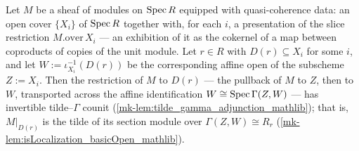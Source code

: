 \begin{lemma}
  \label{mk-lem:isIso_fromTildeΓ_basicOpen_of_quasicoherent}
  \leanok

  Let \(M\) be a sheaf of modules on \(\operatorname{Spec} R\) equipped with quasi-coherence data: an
  open cover \(\{X_i\}\) of \(\operatorname{Spec} R\) together with, for each \(i\), a presentation of
  the slice restriction \(M.\mathrm{over}\,X_i\) — an exhibition of it as the cokernel of
  a map between coproducts of copies of the unit module. Let \(r \in R\) with
  \(D(r) \subseteq X_i\) for some \(i\), and let \(W := \iota_{X_i}^{-1}(D(r))\) be the
  corresponding affine open of the subscheme \(Z := X_i\). Then the restriction of \(M\)
  to \(D(r)\) — the pullback of \(M\) to \(Z\), then to \(W\), transported across the
  affine identification \(W \cong \operatorname{Spec}\Gamma(Z, W)\) — has invertible
  tilde--\(\Gamma\) counit (\ref{mk-lem:tilde_gamma_adjunction_mathlib}); that is,
  \(M|_{D(r)}\) is the tilde of its section module over
  \(\Gamma(Z, W) \cong R_r\) (\ref{mk-lem:isLocalization_basicOpen_mathlib}).
\end{lemma}
